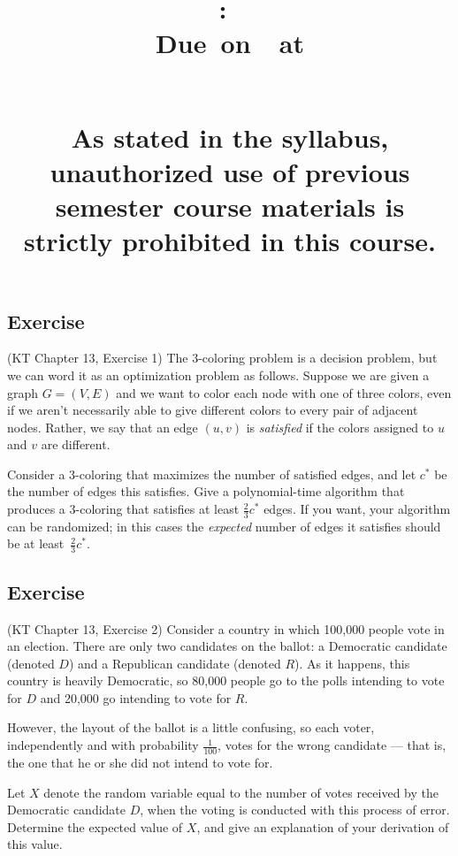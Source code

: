 \documentclass{article}
\title{
    \vspace{2in}
    \textbf{\hmwkClass:\ \hmwkTitle}\\
    \normalsize\vspace{0.1in}\small{Due\ on\ \hmwkDueDate\ at \hmwkDueTime}\\
    \vspace{0.1in}\large{\textit{\hmwkClassInstructor\ \hmwkSection}} \\
    \vspace{0.8in}
    \begin{minipage}[t]{0.4\columnwidth}
        {\footnotesize\textbf{As stated in the syllabus, unauthorized use of previous semester course materials is strictly prohibited in this course.
        }}
    \vspace{0.5in}
    \end{minipage}
    \vspace{0.8in}
    \author{\textbf{\hmwkAuthorName}}
    \date{}
}
\newcounter{counter}
\newcommand{\Exercise}{Exercise \stepcounter{counter}\thecounter}
\begin{document}
\maketitle
\pagebreak

\subsection*{\Exercise}
    (KT Chapter 13, Exercise 1)  The 3-coloring problem is a decision problem, but we can word it as an optimization problem as follows.  Suppose we are given a graph $G = (V, E)$ and we want to color each node with one of three colors, even if we aren't necessarily able to give different colors to every pair of adjacent nodes.  Rather, we say that an edge $(u,v)$ is {\it satisfied} if the colors assigned to $u$ and $v$ are different.  

    \vspace{2mm}
    Consider a 3-coloring that maximizes the number of satisfied edges, and let $c^*$ be the number of edges this satisfies.  Give a polynomial-time algorithm that produces a 3-coloring that satisfies at least $\frac23 c^*$ edges.  If you want, your algorithm can be randomized; in this cases the {\it expected} number of edges it satisfies should be at least~$\frac23 c^*$.

\subsection*{\Exercise}
    (KT Chapter 13, Exercise 2)  Consider a country in which 100,000 people vote in an election.  There are only two candidates on the ballot:  a Democratic candidate (denoted $D$) and a Republican candidate (denoted $R$). As it
    happens, this country is heavily Democratic, so 80,000 people go to the polls intending to vote for $D$ and 20,000 go intending to vote for $R$.
    
    \vspace{2mm}
    However, the layout of the ballot is a little confusing, so each voter,
    independently and with probability $\frac1{100}$, votes for the wrong
    candidate --- that is, the one that he or she did not intend to vote for. 
    
    \vspace{2mm}
    Let $X$ denote the random variable equal to the number of votes received by the Democratic candidate $D$, when the voting is conducted with this process of error.  Determine the expected value of $X$, and give an explanation of your derivation of this value. 
\end{document}
